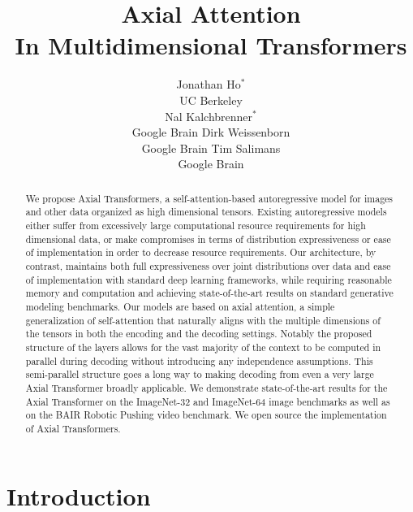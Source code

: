 \documentclass{article} \usepackage{iclr2020_conference,times}
\title{Axial Attention \\ In Multidimensional Transformers}
\author{Jonathan Ho$^*$ \\ UC Berkeley\\  \And Nal Kalchbrenner$^*$ \\ Google Brain \And Dirk Weissenborn \\ Google Brain \And Tim Salimans \\Google Brain}
\begin{document}
\maketitle

\begin{abstract}


We propose Axial Transformers, a self-attention-based autoregressive model for images and other data organized as high dimensional tensors. Existing autoregressive models either suffer from excessively large computational resource requirements for high dimensional data, or make compromises in terms of distribution expressiveness or ease of implementation in order to decrease resource requirements. Our architecture, by contrast, maintains both full expressiveness over joint distributions over data and ease of implementation with standard deep learning frameworks, while requiring reasonable memory and computation and achieving state-of-the-art results on standard generative modeling benchmarks. Our models are based on axial attention, a simple generalization of self-attention that naturally aligns with the multiple dimensions of the tensors in both the encoding and the decoding settings. Notably the proposed structure of the layers allows for the vast majority of the context to be computed in parallel during decoding without introducing any independence assumptions. This semi-parallel structure goes a long way to making decoding from even a very large Axial Transformer broadly applicable. We demonstrate state-of-the-art results for the Axial Transformer on the ImageNet-32 and ImageNet-64 image benchmarks as well as on the BAIR Robotic Pushing video benchmark. We open source the implementation of Axial Transformers.
\end{abstract}

\section{Introduction}
\end{document}
